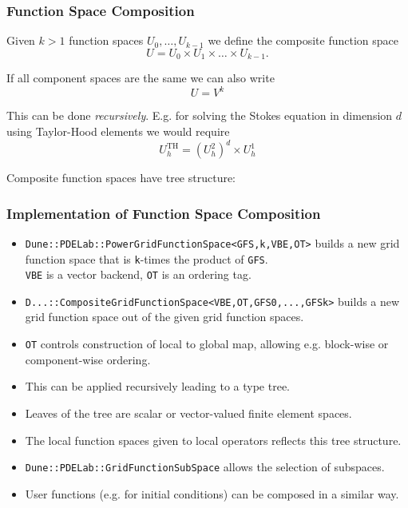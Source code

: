 \begin{frame}
\frametitle{Function Space Composition}
Given $k>1$ function spaces $U_0, \ldots, U_{k-1}$ we define the
composite function space
\begin{equation*}
U = U_0 \times U_1 \times \ldots \times U_{k-1} .
\end{equation*}

If all component spaces are the same we can also write
\begin{equation*}
U = V^k
\end{equation*}

This can be done \textit{recursively}. E.g. for solving the Stokes equation
in dimension $d$ using Taylor-Hood elements we would require
\begin{equation*}
U_h^\text{TH} = \left( U_h^2\right)^d \times U_h^1
\end{equation*}

Composite function spaces have tree structure:
\begin{minipage}[c]{0.2\textwidth}
\end{minipage}
\end{frame}

\begin{frame}
\frametitle{Implementation of Function Space Composition}
\begin{itemize}
\item \lstinline{Dune::PDELab::PowerGridFunctionSpace<GFS,k,VBE,OT>} builds a
new grid function space that is \lstinline{k}-times the product of \lstinline{GFS}.\\
\lstinline{VBE} is a vector backend, \lstinline{OT} is an ordering tag.
\item \lstinline{D...::CompositeGridFunctionSpace<VBE,OT,GFS0,...,GFSk>}
builds a new grid function space out of the given grid function
spaces.
\item \lstinline{OT} controls construction of local to global map, allowing e.g. block-wise or component-wise ordering.
\item This can be applied recursively leading to a type tree.
\item Leaves of the tree are scalar or vector-valued finite element spaces.
\item The local function spaces given to local operators reflects this tree structure.
\item \lstinline{Dune::PDELab::GridFunctionSubSpace} allows the selection of subspaces.
\item User functions (e.g. for initial conditions) can be composed in a similar way.
\end{itemize}
\end{frame}

